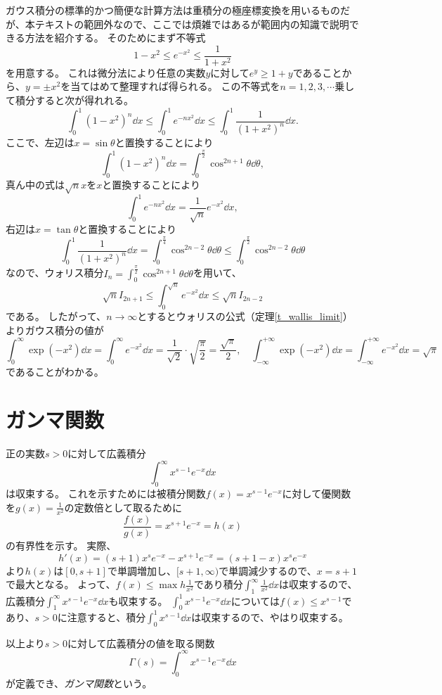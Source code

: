 ガウス積分の標準的かつ簡便な計算方法は重積分の極座標変換を用いるものだが、本テキストの範囲外なので、ここでは煩雑ではあるが範囲内の知識で説明できる方法を紹介する。
そのためにまず不等式
$$
1-x^2 \le e^{-x^2} \le \frac{1}{1+x^2}
$$
を用意する。
これは微分法により任意の実数$y$に対して$e^y \ge 1+y$であることから、$y = \pm x^2$を当てはめて整理すれば得られる。
この不等式を$n = 1, 2, 3, \cdots$乗して積分すると次が得れれる。
$$
\int_0^1 (1-x^2)^n\dd{x} \le \int_0^1 e^{-n x^2}\dd{x} \le \int_0^1 \frac{1}{(1+x^2)^n}\dd{x}.
$$
ここで、左辺は$x = \sin\theta$と置換することにより
$$
\int_0^1 (1-x^2)^n\dd{x} = \int_0^{\frac{\pi}{2}} \cos^{2 n+1}\theta\dd{\theta},
$$
真ん中の式は$\sqrt{n}x$を$x$と置換することにより
$$
\int_0^1 e^{-n x^2}\dd{x} = \frac{1}{\sqrt{n}} e^{-x^2}\dd{x},
$$
右辺は$x = \tan\theta$と置換することにより
$$
\int_0^1 \frac{1}{(1+x^2)^n}\dd{x} = \int_0^{\frac{\pi}{4}} \cos^{2 n-2}\theta\dd{\theta} \le \int_0^{\frac{\pi}{2}} \cos^{2 n-2}\theta\dd{\theta}
$$
なので、ウォリス積分$I_n = \int_0^{\frac{\pi}{2}} \cos^{2 n+1}\theta\dd{\theta}$を用いて、
$$
\sqrt{n}I_{2 n+1} \le \int_0^{\sqrt{n}} e^{-x^2}\dd{x} \le \sqrt{n}I_{2 n-2}
$$
である。
したがって、$n \to \infty$とするとウォリスの公式（定理\ref{t_wallis_limit}）よりガウス積分の値が
$$
\int_0^\infty \exp(-x^2)\dd{x} = \int_0^\infty e^{-x^2}\dd{x} = \frac{1}{\sqrt{2}}\cdot\sqrt{\frac{\pi}{2}} = \frac{\sqrt{\pi}}{2},
\quad \int_{-\infty}^{+\infty} \exp(-x^2)\dd{x} = \int_{-\infty}^{+\infty} e^{-x^2}\dd{x} = \sqrt{\pi}
$$
であることがわかる。

\section{ガンマ関数}

正の実数$s > 0$に対して広義積分
$$
\int_0^\infty x^{s-1}e^{-x}\dd{x}
$$
は収束する。
これを示すためには被積分関数$f(x) = x^{s-1}e^{-x}$に対して優関数を$g(x) = \frac{1}{x^2}$の定数倍として取るために
$$
\frac{f(x)}{g(x)} = x^{s+1}e^{-x} = h(x)
$$
の有界性を示す。
実際、
$$
h'(x) = (s+1)x^s e^{-x}-x^{s+1}e^{-x} = (s+1-x)x^s e^{-x}
$$
より$h(x)$は$[0, s+1]$で単調増加し、$[s+1, \infty)$で単調減少するので、$x = s+1$で最大となる。
よって、$f(x) \le \max h \frac{1}{x^2}$であり積分$\int_1^\infty \frac{1}{x^2}\dd{x}$は収束するので、広義積分$\int_1^\infty x^{s-1}e^{-x}\dd{x}$も収束する。
$\int_0^1 x^{s-1}e^{-x}\dd{x}$については$f(x) \le x^{s-1}$であり、$s > 0$に注意すると、積分$\int_0^1 x^{s-1}\dd{x}$は収束するので、やはり収束する。

以上より$s > 0$に対して広義積分の値を取る関数
$$
\Gamma(s) = \int_0^\infty x^{s-1}e^{-x}\dd{x}
$$
が定義でき、\emph{ガンマ関数}という。

